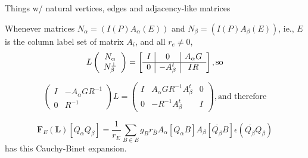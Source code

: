 \documentclass{beamer}
\newcommand{\ext}[1]{\ensuremath{\mathbf{#1}}}
\begin{document}
\begin{frame}{Things w/ natural vertices, edges and adjacency-like matrices}

  Whenever matrices $N_\alpha = ( I(P) A_\alpha(E))$ and $N_\beta= (I(P) A_\beta(E))$,
  ie., $E$ is the column label set of matrix $A_i$, and all $r_e\neq 0$,
   \[
    L\left( \begin{array}{c} N_{\alpha}\\ N_{\beta}^{\perp} \end{array} \right)
    = \left[\begin{array}{c|c|c} I  &  0  &  A_\alpha  G \\  \hline
0  & -A_\beta^t  &  IR \end{array}\right], \text{so}
    \]

   \[
    \left(\begin{array}{cc} I & -A_\alpha  G R^{-1} \\
      0 & R^{-1} \end{array} \right) L
    = \left(\begin{array}{ccc}
        I & A_\alpha GR^{-1}A_\beta^t& 0 \\
        0 & -R^{-1}A_\beta ^t    & I
        \end{array} \right), \text{and therefore}
    \]

    \[
    \ext{F}_E(\ext{L})[Q_\alpha Q_\beta] = \frac{1}{r_E}\sum_{B\in E}g_B r_{\overline{B}} A_\alpha[Q_\alpha B] A_\beta[\overline{Q_\beta}B]
    \epsilon(\overline{Q_\beta}Q_\beta)
    \]
    has this Cauchy-Binet expansion.
\end{frame}
\end{document}
